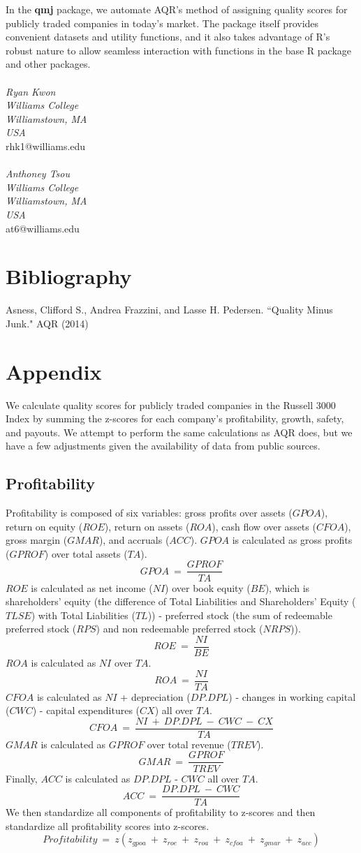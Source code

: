 \documentclass[titlepage]{article}
\begin{document}
In the \textbf{qmj} package, we automate AQR's method of assigning quality scores for publicly traded companies in today's market. The package itself provides convenient datasets and utility functions, and it also takes advantage of R's robust nature to allow seamless interaction with functions in the base R package and other packages.
\\
\\
\emph{Ryan Kwon}
\\
\emph{Williams College}
\\
\emph{Williamstown, MA}
\\
\emph{USA}
\\
rhk1@williams.edu
\\
\\
\emph{Anthoney Tsou}
\\
\emph{Williams College}
\\
\emph{Williamstown, MA}
\\
\emph{USA}
\\
at6@williams.edu

\section*{Bibliography}
Asness, Clifford S., Andrea Frazzini, and Lasse H. Pedersen. ``Quality Minus Junk." AQR (2014)
\section*{Appendix}
We calculate quality scores for publicly traded companies in the Russell 3000 Index by summing the z-scores for each company's profitability, growth, safety, and payouts. We attempt to perform the same calculations as AQR does, but we have a few adjustments given the availability of data from public sources. 
\subsection*{Profitability}
Profitability is composed of six variables: gross profits over assets ($GPOA$), return on equity ($ROE$), return on assets ($ROA$), cash flow over assets ($CFOA$), gross margin ($GMAR$), and accruals ($ACC$). $GPOA$ is calculated as gross profits ($GPROF$) over total assets ($TA$). $$GPOA \ = \ \frac{GPROF}{TA}$$ $ROE$ is calculated as net income ($NI$) over book equity ($BE$), which is shareholders' equity (the difference of Total Liabilities and Shareholders' Equity ($TLSE$) with Total Liabilities ($TL$)) - preferred stock (the sum of redeemable preferred stock ($RPS$) and non redeemable preferred stock ($NRPS$)). $$ROE \ = \ \frac{NI}{BE}$$ $ROA$ is calculated as $NI$ over $TA$. $$ROA \ = \ \frac{NI}{TA}$$ $CFOA$ is calculated as $NI$ + depreciation ($DP.DPL$) - changes in working capital ($CWC$) - capital expenditures ($CX$) all over $TA$. $$CFOA \ = \ \frac{NI \ + \ DP.DPL \ - \ CWC \ - \ CX}{TA}$$ $GMAR$ is calculated as $GPROF$ over total revenue ($TREV$). $$GMAR \ = \ \frac{GPROF}{TREV}$$ Finally, $ACC$ is calculated as $DP.DPL$ - $CWC$ all over $TA$. $$ACC \ = \ \frac{DP.DPL \ - \ CWC}{TA}$$ We then standardize all components of profitability to z-scores and then standardize all profitability scores into z-scores. $$Profitability \ = \ z(z_{gpoa} \ + \ z_{roe} \ + \ z_{roa} \ + \ z_{cfoa} \ + \ z_{gmar} \ + \ z_{acc})$$
\end{document}
